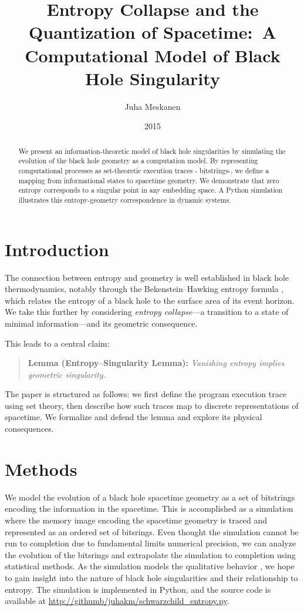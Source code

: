 \documentclass[11pt]{article}
\title{Entropy Collapse and the Quantization of Spacetime:\ A Computational Model of Black Hole Singularity}
\author{Juha Meskanen}
\date{2015}
\begin{document}
\maketitle

\begin{abstract}
  We present an information-theoretic model of black hole singularities by simulating the evolution of the black hole geometry as a computation model. By representing computational processes as set-theoretic execution traces - bitstrings-, we define a mapping
  from informational states to spacetime geometry. We demonstrate that zero entropy corresponds to a singular point in any
  embedding space. A Python simulation illustrates this entropy-geometry correspondence in dynamic systems.
\end{abstract}

\section{Introduction}

The connection between entropy and geometry is well established in black hole thermodynamics, notably through the Bekenstein--Hawking entropy formula \cite{Bekenstein1973,Hawking1975}, which relates the entropy of a black hole to the surface area of its event horizon. We take this further by considering \emph{entropy collapse}---a transition to a state of minimal information---and its geometric consequence.

This leads to a central claim:

\begin{quote}
  \textbf{Lemma (Entropy--Singularity Lemma):} \emph{Vanishing entropy implies geometric singularity.}
\end{quote}

The paper is structured as follows: we first define the program execution trace using set theory, then describe how such traces map to discrete representations of spacetime. We formalize and defend the lemma and explore its physical consequences.

\section{Methods}

We model the evolution of a black hole spacetime geometry as a set of bitstrings encoding the information in the spacetime. This is accomplished as a simulation where the memory image encoding the spacetime geometry is traced and represented as an ordered set of bitsrings. Even thought the simulation cannot be run to  completion due to  fundamental limits numerical precision, we can analyze the evolution of the bitsrings and extrapolate the simulation to completion using statistical methods. As the simulation
models the qualitative behavior , we hope to gain insight into the nature of black hole singularities and their relationship to entropy.
The simulation is implemented in Python, and the source code is available at \url{http://githumb/juhakm/schwarzchild\_entropy.py}.
\end{document}
